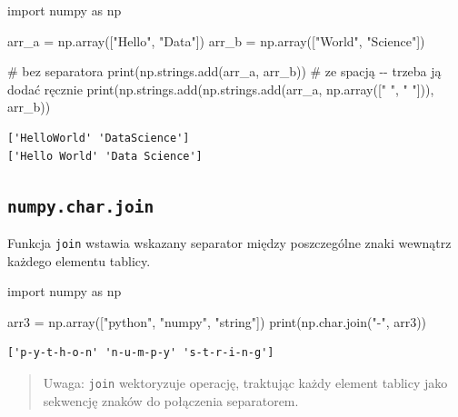 \documentclass[
  polish,
  letterpaper,
  DIV=11,
  numbers=noendperiod]{scrreprt}
\newenvironment{Shaded}{\begin{snugshade}}{\end{snugshade}}
\newcommand{\BuiltInTok}[1]{\textcolor[rgb]{0.00,0.23,0.31}{#1}}
\newcommand{\CommentTok}[1]{\textcolor[rgb]{0.37,0.37,0.37}{#1}}
\newcommand{\ImportTok}[1]{\textcolor[rgb]{0.00,0.46,0.62}{#1}}
\newcommand{\NormalTok}[1]{\textcolor[rgb]{0.00,0.23,0.31}{#1}}
\newcommand{\OperatorTok}[1]{\textcolor[rgb]{0.37,0.37,0.37}{#1}}
\newcommand{\StringTok}[1]{\textcolor[rgb]{0.13,0.47,0.30}{#1}}
\begin{document}
\begin{Shaded}
\begin{Highlighting}[]
\ImportTok{import}\NormalTok{ numpy }\ImportTok{as}\NormalTok{ np}

\NormalTok{arr\_a }\OperatorTok{=}\NormalTok{ np.array([}\StringTok{"Hello"}\NormalTok{, }\StringTok{"Data"}\NormalTok{])}
\NormalTok{arr\_b }\OperatorTok{=}\NormalTok{ np.array([}\StringTok{"World"}\NormalTok{, }\StringTok{"Science"}\NormalTok{])}

\CommentTok{\# bez separatora}
\BuiltInTok{print}\NormalTok{(np.strings.add(arr\_a, arr\_b))}
\CommentTok{\# ze spacją {-}{-} trzeba ją dodać ręcznie}
\BuiltInTok{print}\NormalTok{(np.strings.add(np.strings.add(arr\_a, np.array([}\StringTok{" "}\NormalTok{, }\StringTok{" "}\NormalTok{])), arr\_b))}
\end{Highlighting}
\end{Shaded}

\begin{verbatim}
['HelloWorld' 'DataScience']
['Hello World' 'Data Science']
\end{verbatim}

\subsection{\texorpdfstring{\texttt{numpy.char.join}}{numpy.char.join}}\label{numpy.char.join}

Funkcja \texttt{join} wstawia wskazany separator między poszczególne
znaki wewnątrz każdego elementu tablicy.

\begin{Shaded}
\begin{Highlighting}[]
\ImportTok{import}\NormalTok{ numpy }\ImportTok{as}\NormalTok{ np}

\NormalTok{arr3 }\OperatorTok{=}\NormalTok{ np.array([}\StringTok{"python"}\NormalTok{, }\StringTok{"numpy"}\NormalTok{, }\StringTok{"string"}\NormalTok{])}
\BuiltInTok{print}\NormalTok{(np.char.join(}\StringTok{"{-}"}\NormalTok{, arr3))}
\end{Highlighting}
\end{Shaded}

\begin{verbatim}
['p-y-t-h-o-n' 'n-u-m-p-y' 's-t-r-i-n-g']
\end{verbatim}

\begin{quote}
Uwaga: \texttt{join} wektoryzuje operację, traktując każdy element
tablicy jako sekwencję znaków do połączenia separatorem.
\end{quote}
\end{document}
